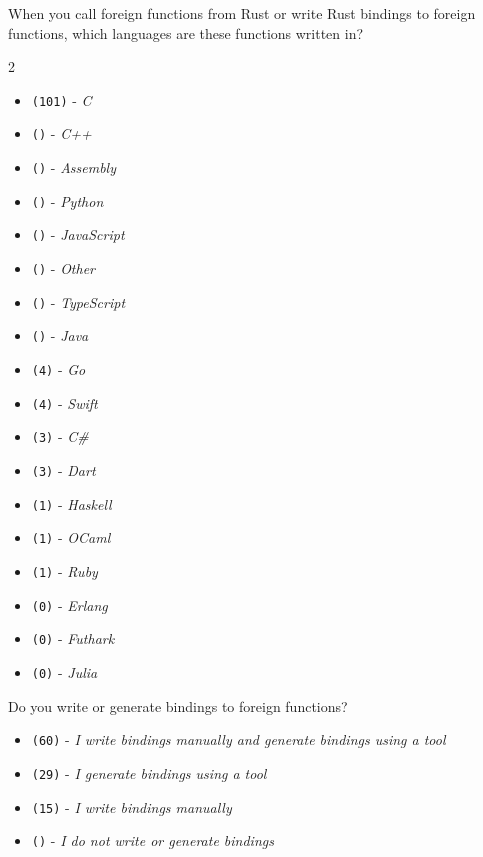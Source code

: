 \begin{protocol}
\item \label{survey:ffibq1}  When you call foreign functions from Rust or write Rust bindings to foreign functions, which languages are these functions written in?
\begin{multicols}{2}
\begin{itemize}
\item \texttt{(101)} - \textit{C}
\item \texttt{()} - \textit{C++}
\item \texttt{()} - \textit{Assembly}
\item \texttt{()} - \textit{Python}
\item \texttt{()} - \textit{JavaScript}
\item \texttt{()} - \textit{Other}
\item \texttt{()} - \textit{TypeScript}
\item \texttt{(\space {})} - \textit{Java}
\item \texttt{(4)} - \textit{Go}
\item \texttt{(4)} - \textit{Swift}
\item \texttt{(3)} - \textit{C\#}
\item \texttt{(3)} - \textit{Dart}
\item \texttt{(1)} - \textit{Haskell}
\item \texttt{(1)} - \textit{OCaml}
\item \texttt{(1)} - \textit{Ruby}
\item \texttt{(0)} - \textit{Erlang}
\item \texttt{(0)} - \textit{Futhark}
\item \texttt{(0)} - \textit{Julia}
\end{itemize}
\end{multicols}
\item \label{survey:ffibq2}  Do you write or generate bindings to foreign functions?
\begin{itemize}
\item \texttt{(60)} - \textit{I write bindings manually and generate bindings using a tool}
\item \texttt{(29)} - \textit{I generate bindings using a tool}
\item \texttt{(15)} - \textit{I write bindings manually}
\item \texttt{()} - \textit{I do not write or generate bindings}
\end{itemize}

\end{protocol}
